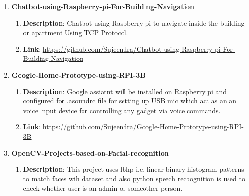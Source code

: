 \documentclass[12pt]{article}
\begin{document}
\vspace{0.1cm}
\begin{enumerate}[label*={\fontsize{13pt}{13pt}\selectfont \textbf{\textbf{\arabic*.}}}]
	\item {\fontsize{13pt}{15.6pt}\selectfont \textbf{Chatbot-using-Raspberry-pi-For-Building-Navigation}\par}\par

\begin{enumerate}
	\item {\fontsize{13pt}{15.6pt}\selectfont \textbf{Description}: Chatbot using Raspberry-pi to navigate inside the building or apartment Using TCP Protocol.\par}\par

	\item {\fontsize{13pt}{15.6pt}\selectfont \textbf{Link}: \href{https://github.com/Sujeendra/Chatbot-using-Raspberry-pi-For-Building-Navigation}{https://github.com/Sujeendra/Chatbot-using-Raspberry-pi-For-Building-Navigation} \par}\end{enumerate}\par


\vspace{0.1cm}
	\item {\fontsize{13pt}{15.6pt}\selectfont \textbf{Google-Home-Prototype-using-RPI-3B}\par}\par
\begin{enumerate}
	\item {\fontsize{13pt}{15.6pt}\selectfont \textbf{Description}: Google assiatnt will be installed on Raspberry pi and configured for .asoundrc file for setting up USB mic which act as an an voice input device for controlling any gadget via voice commands.\par}\par

	\item {\fontsize{13pt}{15.6pt}\selectfont \textbf{Link}: \href{https://github.com/Sujeendra/Google-Home-Prototype-using-RPI-3B}{https://github.com/Sujeendra/Google-Home-Prototype-using-RPI-3B}\par}\end{enumerate}\par


\vspace{\baselineskip}
	\item {\fontsize{13pt}{15.6pt}\selectfont \textbf{OpenCV-Projects-based-on-Facial-recognition}\par}\par
\begin{enumerate}
	\item {\fontsize{13pt}{15.6pt}\selectfont \textbf{Description}: This project uses lbhp i.e. linear binary histogram patterns to match faces wih dataset and also python speech recoognition is used to check whether user is an admin or someother person.\par}\par


\end{enumerate}
\end{enumerate}
\end{document}
